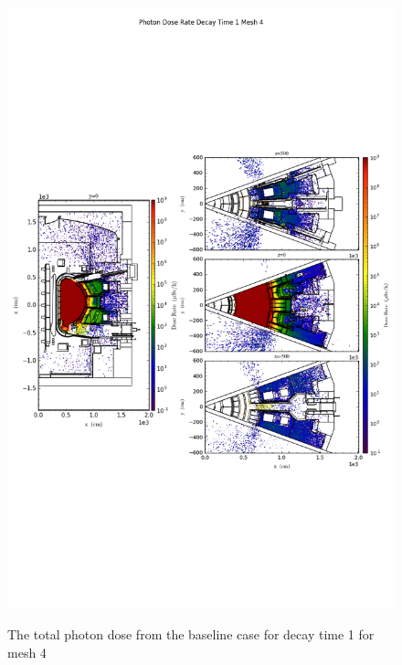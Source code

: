 \begin{figure}[ht!]
\centering
\includegraphics[trim={0cm 9cm 0cm 10cm},clip,scale=0.75]{../plots/final_model_nob4c/Photon_Dose_Rate_Decay_Time_1_Mesh_4.png}
\label{fig:photons_dc1_no4bc_m4_flux}
\caption{The total photon dose from the baseline case for decay time 1 for mesh 4}
\end{figure}
